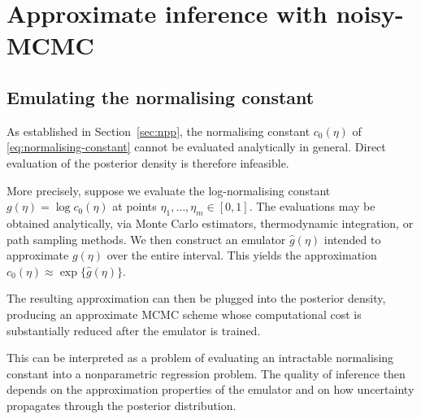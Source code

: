 \chapter{Approximate inference with noisy-MCMC}
\label{chap:approximate}




\section{Emulating the normalising constant}

As established in Section~\ref{sec:npp}, the normalising constant $c_0(\eta)$ of \eqref{eq:normalising-constant} cannot be evaluated analytically in general.
Direct evaluation of the posterior density is therefore infeasible.

More precisely, suppose we evaluate the log-normalising constant $g(\eta) =\log c_0(\eta)$ at points $\eta_1, \ldots, \eta_m \in [0,1]$.
The evaluations may be obtained analytically, via Monte Carlo estimators, thermodynamic integration, or path sampling methods.
We then construct an emulator $\widehat g(\eta)$ intended to approximate $g(\eta)$ over the entire interval.
This yields the approximation 
$c_0(\eta)
\approx
\exp\{\widehat g(\eta)\}. $

The resulting approximation can then be plugged into the posterior density, producing an approximate MCMC scheme whose computational cost is substantially reduced after the emulator is trained.

This can be interpreted as a problem of evaluating an intractable normalising constant into a nonparametric regression problem.
The quality of inference then depends on the approximation properties of the emulator and on how uncertainty propagates through the posterior distribution.

